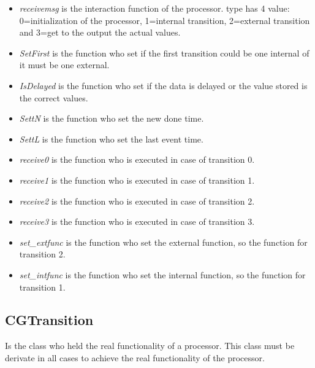 \documentclass[a4paper,oneside,notitlepage]{article}
\begin{document}
\begin{itemize}
\item \textit{receivemsg} is the interaction function of the processor. type
has 4 value: 0=initialization of the processor, 1=internal transition,
2=external transition and 3=get to the output the actual values.

\item \textit{SetFirst} is the function who set if the first transition
could be one internal of it must be one external.

\item \textit{IsDelayed} is the function who set if the data is delayed or
the value stored is the correct values.

\item \textit{SettN} is the function who set the new done time.

\item \textit{SettL} is the function who set the last event time.

\item \textit{receive0} is the function who is executed in case of
transition 0.

\item \textit{receive1} is the function who is executed in case of
transition 1.

\item \textit{receive2} is the function who is executed in case of
transition 2.

\item \textit{receive3} is the function who is executed in case of
transition 3.

\item \textit{set\_extfunc} is the function who set the external function,
so the function for transition 2.

\item \textit{set\_intfunc} is the function who set the internal function,
so the function for transition 1.
\end{itemize}

\subsection{CGTransition}

Is the class who held the real functionality of a processor. This class must
be derivate in all cases to achieve the real functionality of the processor.
\end{document}
